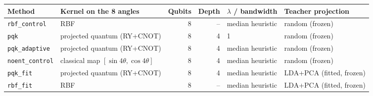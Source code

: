 \begin{tabular}{@{}llrrll@{}}
\toprule
Method & Kernel on the 8 angles & Qubits & Depth & $\lambda$ / bandwidth & Teacher projection \\
\midrule
\texttt{rbf\_control} & RBF & 8 & -- & median heuristic & random (frozen) \\
\texttt{pqk} & projected quantum (RY+CNOT) & 8 & 4 & 1 & random (frozen) \\
\texttt{pqk\_adaptive} & projected quantum (RY+CNOT) & 8 & 4 & median heuristic & random (frozen) \\
\texttt{noent\_control} & classical map $[\sin4\theta,\cos4\theta]$ & 8 & 4 & median heuristic & random (frozen) \\
\texttt{pqk\_fit} & projected quantum (RY+CNOT) & 8 & 4 & median heuristic & LDA+PCA (fitted, frozen) \\
\texttt{rbf\_fit} & RBF & 8 & -- & median heuristic & LDA+PCA (fitted, frozen) \\
\bottomrule
\end{tabular}
